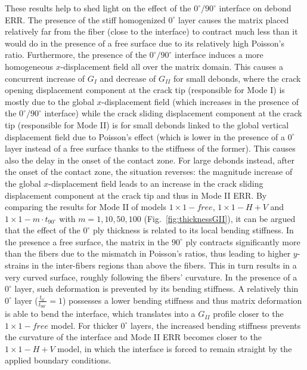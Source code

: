 \documentclass[review]{elsarticle}
\begin{document}
These results help to shed light on the effect of the $0^{\circ}/90^{\circ}$ interface on debond ERR. The presence of the stiff homogenized $0^{\circ}$ layer causes the matrix placed relatively far from the fiber (close to the interface) to contract much less than it would do in the presence of a free surface due to its relatively high Poisson's ratio. Furthermore, the presence of the $0^{\circ}/90^{\circ}$ interface induces a more homogeneous $x$-displacement field all over the matrix domain. This causes a concurrent increase of $G_{I}$ and decrease of $G_{II}$ for small debonds, where the crack opening displacement component at the crack tip (responsible for Mode I) is mostly due to the global $x$-displacement field (which increases in the presence of the $0^{\circ}/90^{\circ}$  interface) while the crack sliding displacement component at the crack tip (responsible for Mode II) is for small debonds linked to the global vertical displacement field due to Poisson's effect (which is lower in the presence of a $0^{\circ}$ layer instead of a free surface thanks to the stiffness of the former). This causes also the delay in the onset of the contact zone. For large debonds instead, after the onset of the contact zone, the situation reverses: the magnitude increase of the global $x$-displacement field leads to an increase in the crack sliding displacement component at the crack tip and thus in Mode II ERR. By comparing the results for Mode II of models $1\times 1-free$, $1\times 1-H+V$ and $1\times 1-m\cdot t_{90^{\circ}}$ with $m=1,10,50,100$ (Fig.~\ref{fig:thicknessGII}), it can be argued that the effect of the $0^{\circ}$ ply thickness is related to its local bending stiffness. In the presence a free surface, the matrix in the $90^{\circ}$ ply contracts significantly more than the fibers due to the mismatch in Poisson's ratios, thus leading to higher $y$-strains in the inter-fibers regions than above the fibers. This in turn results in a very curved surface, roughly following the fibers' curvature. In the presence of a $0^{\circ}$ layer, such deformation is prevented by its bending stiffness. A relatively thin $0^{\circ}$ layer ($\frac{t_{0^{\circ}}}{t_{90^{\circ}}}=1$) possesses a lower bending stiffness and thus matrix deformation is able to bend the interface, which translates into a $G_{II}$ profile closer to the $1\times 1-free$ model. For thicker $0^{\circ}$ layers, the increased bending stiffness prevents the curvature of the interface and Mode II ERR becomes closer to the $1\times 1-H+V$ model, in which the interface is forced to remain straight by the applied boundary conditions.
\end{document}
